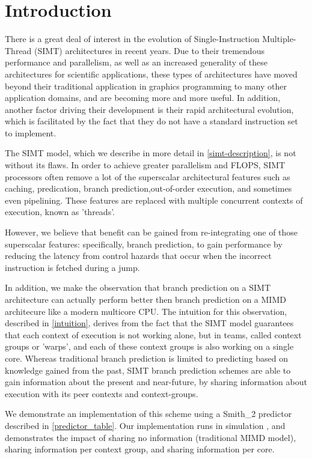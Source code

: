 \documentclass[conference]{IEEEtran}
\begin{document}
\section{Introduction}
There is a great deal of interest in the evolution of Single-Instruction Multiple-Thread (SIMT) architectures in recent years.  Due to
their tremendous performance and parallelism, as well as an increased generality of these architectures for scientific applications, these 
types of architectures have moved beyond their traditional application in graphics programming to many other application domains, and are becoming more and more useful.
In addition, another factor driving their development is their rapid architectural evolution, which is facilitated by the fact that they do not have a standard instruction set
to implement.  

The SIMT model, which we describe in more detail in \ref{simt-description}, is not without its flaws.  In order to achieve greater parallelism and 
FLOPS, SIMT processors often remove a lot of the superscalar architectural features such as caching, predication, branch prediction,out-of-order execution, and sometimes even pipelining.
These features are replaced with multiple concurrent contexts of execution, known as 'threads'.

However, we believe that benefit can be gained from re-integrating one of those superscalar features: specifically, branch prediction, to gain 
performance by reducing the latency from control hazards that occur when the incorrect instruction is fetched during a jump.  

In addition, we make the observation that branch prediction on a SIMT architecture can actually perform better then branch prediction on a MIMD architecure like a modern multicore CPU.
The intuition for this observation, described in \ref{intuition}, derives from the fact that the SIMT model guarantees that each context of execution
is not working alone, but in teams, called context groups or 'warps', and each of these context groups is also working on a single core.  Whereas traditional branch prediction
is limited to predicting based on knowledge gained from the past, SIMT branch prediction schemes are able to gain information about the present and near-future, by sharing information
about execution with its peer contexts and context-groups.

We demonstrate an implementation of this scheme using a Smith\_2 predictor \cite{smith} described in \ref{predictor_table}.  Our implementation runs in simulation \cite{ispass09},
and demonstrates the impact of sharing no information (traditional MIMD model), sharing information per context group, and sharing information per core.
\end{document}
